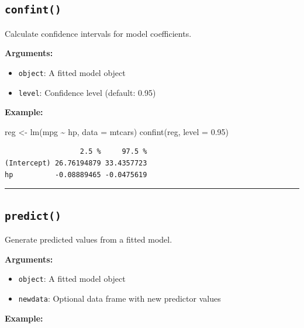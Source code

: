\documentclass[
  letterpaper,
  DIV=11,
  numbers=noendperiod]{scrreprt}
\newenvironment{Shaded}{\begin{snugshade}}{\end{snugshade}}
\newcommand{\AttributeTok}[1]{\textcolor[rgb]{0.40,0.45,0.13}{#1}}
\newcommand{\FloatTok}[1]{\textcolor[rgb]{0.68,0.00,0.00}{#1}}
\newcommand{\FunctionTok}[1]{\textcolor[rgb]{0.28,0.35,0.67}{#1}}
\newcommand{\NormalTok}[1]{\textcolor[rgb]{0.00,0.23,0.31}{#1}}
\newcommand{\OtherTok}[1]{\textcolor[rgb]{0.00,0.23,0.31}{#1}}
\newcommand{\SpecialCharTok}[1]{\textcolor[rgb]{0.37,0.37,0.37}{#1}}
\providecommand{\tightlist}{%
  \setlength{\itemsep}{0pt}\setlength{\parskip}{0pt}}
\begin{document}
\subsection{\texorpdfstring{\texttt{confint()}}{confint()}}\label{confint}

Calculate confidence intervals for model coefficients.

\textbf{Arguments:}

\begin{itemize}
\tightlist
\item
  \texttt{object}: A fitted model object
\item
  \texttt{level}: Confidence level (default: 0.95)
\end{itemize}

\textbf{Example:}

\begin{Shaded}
\begin{Highlighting}[]
\NormalTok{reg }\OtherTok{\textless{}{-}} \FunctionTok{lm}\NormalTok{(mpg }\SpecialCharTok{\textasciitilde{}}\NormalTok{ hp, }\AttributeTok{data =}\NormalTok{ mtcars)}
\FunctionTok{confint}\NormalTok{(reg, }\AttributeTok{level =} \FloatTok{0.95}\NormalTok{)}
\end{Highlighting}
\end{Shaded}

\begin{verbatim}
                  2.5 %     97.5 %
(Intercept) 26.76194879 33.4357723
hp          -0.08889465 -0.0475619
\end{verbatim}

\begin{center}\rule{0.5\linewidth}{0.5pt}\end{center}

\subsection{\texorpdfstring{\texttt{predict()}}{predict()}}\label{predict}

Generate predicted values from a fitted model.

\textbf{Arguments:}

\begin{itemize}
\tightlist
\item
  \texttt{object}: A fitted model object
\item
  \texttt{newdata}: Optional data frame with new predictor values
\end{itemize}

\textbf{Example:}
\end{document}
